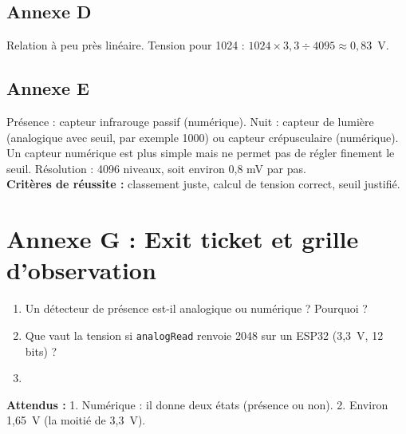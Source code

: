 \documentclass[11pt,a4paper]{article}
\begin{document}
\subsection*{Annexe D}
Relation à peu près linéaire. Tension pour 1024 : $1024 \times 3{,}3 \div 4095 \approx 0{,}83$~V.

\subsection*{Annexe E}
Présence : capteur infrarouge passif (numérique). Nuit : capteur de lumière (analogique avec seuil, par exemple 1000) ou capteur crépusculaire (numérique). Un capteur numérique est plus simple mais ne permet pas de régler finement le seuil. Résolution : 4096 niveaux, soit environ 0,8 mV par pas.\\
\textbf{Critères de réussite :} classement juste, calcul de tension correct, seuil justifié.

\newpage
\section*{Annexe G : Exit ticket et grille d'observation}

\begin{enumerate}
 \item Un détecteur de présence est-il analogique ou numérique ? Pourquoi ?\\ \lig
 \item Que vaut la tension si \texttt{analogRead} renvoie 2048 sur un ESP32 (3,3~V, 12 bits) ?\\ \lig
 \item \autoeval
\end{enumerate}
\textbf{Attendus :} 1. Numérique : il donne deux états (présence ou non). 2. Environ 1,65~V (la moitié de 3,3~V).

\bigskip
{}
\end{document}
